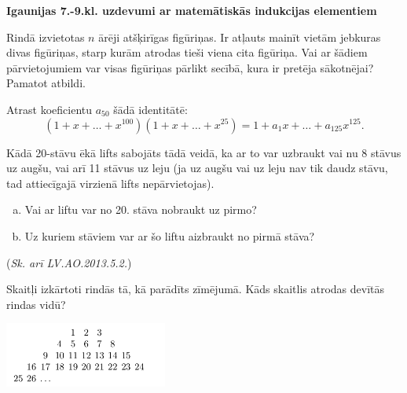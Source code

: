 \documentclass[11pt]{article}
\begin{document}
\begin{center}
{\Large \bf Igaunijas 7.-9.kl. uzdevumi ar matemātiskās indukcijas elementiem}
\end{center}

\begin{problem}[EE.PK.1993.9.5]
Rindā izvietotas $n$ ārēji atšķirīgas figūriņas. 
Ir atļauts mainīt vietām jebkuras divas figūriņas, 
starp kurām atrodas tieši viena cita figūriņa. 
Vai ar šādiem pārvietojumiem var visas figūriņas pārlikt
secībā, kura ir pretēja sākotnējai? Pamatot atbildi. 
\end{problem}



\begin{problem}[EE.PK.1994.9.1]
Atrast koeficientu $a_{50}$ šādā identitātē:
$$\left( 1 + x + \ldots + x^{100} \right) \left( 1 + x + \ldots + x^{25} \right)
= 1 + a_1x + \ldots + a_{125}x^{125}.$$
\end{problem}




\begin{problem}[EE.PK.1995.7.3]
Kādā 20-stāvu ēkā lifts sabojāts tādā veidā, ka ar to var 
uzbraukt vai nu 8 stāvus uz augšu, vai arī 11 stāvus uz leju
(ja uz augšu vai uz leju nav tik daudz stāvu, tad attiecīgajā virzienā 
lifts nepārvietojas). 
\begin{enumerate}[(a)]
\item Vai ar liftu var no 20. stāva nobraukt uz pirmo?
\item Uz kuriem stāviem var ar šo liftu aizbraukt no pirmā stāva?
\end{enumerate}
({\em Sk. arī LV.AO.2013.5.2.})
\end{problem}


\begin{problem}[EE.PK.1998.7.TEST.5]
Skaitļi izkārtoti rindās tā, kā parādīts zīmējumā. 
Kāds skaitlis atrodas devītās rindas vidū?
\begin{center}
\includegraphics[width=0.4\textwidth]{math-induction-junior-classes/EE-PK-1998-7-TEST-4.png}
\end{center}
\end{problem}
\end{document}
